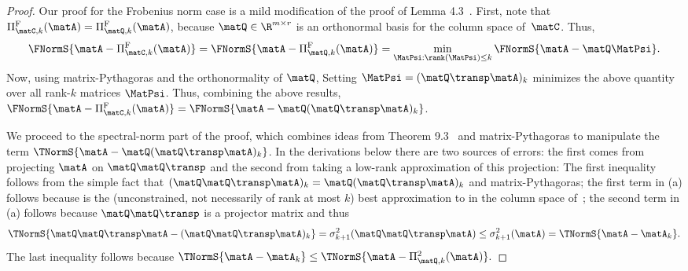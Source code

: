 \begin{proof}
Our proof for the Frobenius norm case is a mild modification of the proof of Lemma 4.3~\cite{CW09}. First, note that $\Pi^{\mathrm{F}}_{\matC,k}(\matA) = \Pi^{\mathrm{F}}_{\matQ,k}(\matA)$, because $\matQ \in \R^{m \times r}$ is an orthonormal basis for the column space of~$\matC$. Thus,
$$\FNormS{\matA-\Pi^{\mathrm{F}}_{\matC,k}(\matA)} = \FNormS{\matA-\Pi^{\mathrm{\mathrm{F}}}_{\matQ,k}(\matA)} = \min_{\MatPsi:\rank(\MatPsi)\leq k}\FNormS{\matA-\matQ\MatPsi}.$$
Now, using matrix-Pythagoras and the orthonormality of $\matQ$,
Setting $\MatPsi = (\matQ\transp\matA)_k$ minimizes the above quantity over all rank-$k$ matrices $\MatPsi$. Thus, combining the above results,
$\FNormS{\matA-\Pi^{\mathrm{F}}_{\matC,k}(\matA)} = \FNormS{\matA - \matQ(\matQ\transp \matA)_k}$.

We proceed to the spectral-norm part of the proof, which combines ideas from Theorem 9.3~\cite{HMT} and matrix-Pythagoras to manipulate the term $\TNormS{\matA-\matQ(\matQ\transp\matA)_k}$. In the derivations below there are two sources of errors: the first comes from projecting $\matA$ on $\matQ \matQ\transp$ and the second from taking a low-rank approximation of this projection:
The first inequality follows from the simple fact that $(\matQ\matQ\transp\matA)_k=\matQ(\matQ\transp\matA)_k$ and
matrix-Pythagoras; the first term in (a) follows because \math{\matQ\matQ\transp\matA} is the (unconstrained, not necessarily of rank at most $k$) best approximation to \math{\matA} in the column space of~\math{\matQ}; the second term in (a) follows because $\matQ\matQ\transp$ is a projector matrix and thus
$$\TNormS{\matQ\matQ\transp\matA-(\matQ\matQ\transp\matA)_k}=\sigma_{k+1}^2(\matQ\matQ\transp\matA)\le\sigma_{k+1}^2(\matA) =
\TNormS{\matA-\matA_k}.$$
The last inequality follows because $\TNormS{\matA-\matA_k}\le\TNormS{\matA-\Pi_{\matQ,k}^2(\matA)}.$
\end{proof}

